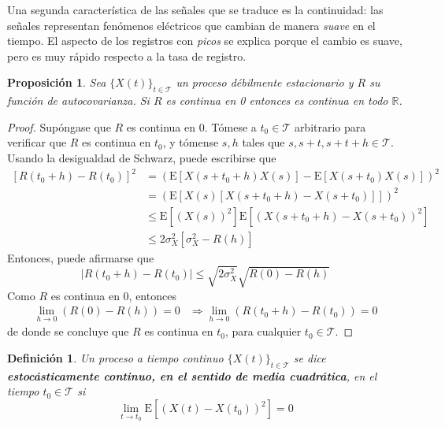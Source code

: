 \documentclass[12pt,letterpaper,draft]{book}
\newtheorem{definicion}{Definición}[chapter]
\newtheorem{proposicion}[teorema]{Proposición}
\newcommand{\R}{\mathbb{R}}
\newcommand{\E}[1]{\mathrm{E}\left[ #1 \right]}
\newcommand{\abso}[1]{\left| #1 \right|}
\newcommand{\xt}{$\{X(t)\}_{t\in \mathcal{T}}$ }
\begin{document}
Una segunda característica de las señales que se traduce es la continuidad: las señales representan fenómenos eléctricos que cambian de manera \textit{suave} en el tiempo.
%
El aspecto de los registros con \textit{picos} se explica porque el cambio es suave, pero es muy rápido respecto a la tasa de registro.

\begin{proposicion}
Sea \xt un proceso débilmente estacionario y $R$ su función de autocovarianza. Si $R$ es continua
en 0 entonces es continua en todo $\R$.
\end{proposicion}

\begin{proof}
Supóngase que $R$ es continua en 0. Tómese a $t_0 \in \mathcal{T}$ arbitrario para verificar que $R$ es continua en $t_0$, y tómense $s,h$ tales que $s,s+t,s+t+h \in\mathcal{T}$. Usando la desigualdad de Schwarz, puede escribirse que
\begin{align*}
\left[ R(t_0+h) -R(t_0) \right]^{2} 
&= \left( \E{X(s+t_0+h)X(s)} - \E{X(s+t_0)X(s)} \right)^{2}  \\
&= \left( \E{X(s)\left[ X(s+t_0+h) - X(s+t_0) \right]} \right)^{2} \\
&\leq \E{\left( X(s) \right)^{2}} \E{\left( X(s+t_0+h) - X(s+t_0) \right)^{2}} \\
&\leq 2 \sigma_X^{2} \left[ \sigma_X^{2} - R(h) \right]
\end{align*}
Entonces, puede afirmarse que
\begin{equation*}
\abso{R(t_0+h) -R(t_0)} \leq \sqrt{2 \sigma_X^{2}} \sqrt{R(0) - R(h)}
\end{equation*}
Como $R$ es continua en 0, entonces 
\begin{align*}
\lim_{h\rightarrow 0} (R(0)-R(h)) = 0 &\Rightarrow \lim_{h\rightarrow 0} (R(t_0+h)-R(t_0)) = 0
\end{align*}
de donde se concluye que $R$ es continua en $t_0$, para cualquier $t_0\in \mathcal{T}$.
\end{proof}    

\begin{definicion}%
Un proceso a tiempo continuo \xt se dice \textbf{estocásticamente continuo, en el sentido de media cuadrática}, en el tiempo $t_0\in \mathcal{T}$ si
\begin{equation*}
\lim_{t \rightarrow t_0} \E{\left( X(t) - X(t_0) \right)^{2}} = 0
\end{equation*}
\label{cont_est}
\end{definicion}
\end{document}
